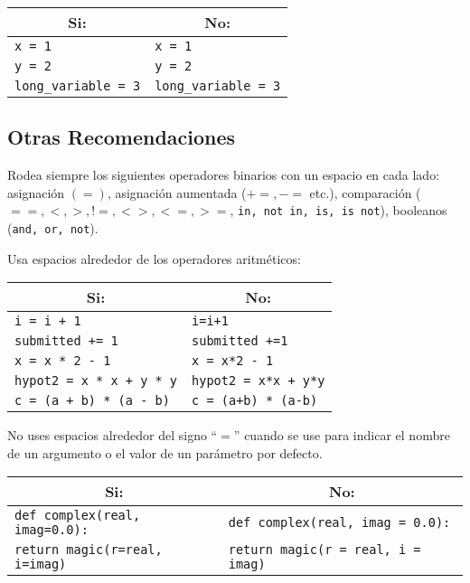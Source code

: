\begin{center}
\begin{tabular}{| l | l |}
\hline
\multicolumn{1}{|c|}{\textbf{Si:}} & \multicolumn{1}{c|}{\textbf{No:}} \\ \hline
\texttt{x = 1} & \texttt{x \hspace{2.7cm} = 1} \\
\texttt{y = 2} & \texttt{y \hspace{2.7cm} = 2} \\
\texttt{long\_variable = 3} &  \texttt{long\_variable = 3} \\ \hline
\end{tabular}
\end{center}
\subsection{Otras Recomendaciones}
Rodea siempre los siguientes operadores binarios con un espacio en cada lado: asignación $(=)$, asignación aumentada ($+=, -= $ etc.), comparación ($==, <, >, !=, <>, <=, >=$, \texttt{in, not in, is, is not}), booleanos (\texttt{and, or, not}).
\par
Usa espacios alrededor de los operadores aritméticos:
\begin{center}
\begin{tabular}{| l | l |}
\hline
\multicolumn{1}{|c|}{\textbf{Si:}} & \multicolumn{1}{c|}{\textbf{No:}} \\ \hline
\texttt{i = i + 1} & \texttt{i=i+1} \\
\texttt{submitted += 1} & \texttt{submitted +=1} \\
\texttt{x = x * 2 - 1} &  \texttt{x = x*2 - 1} \\
\texttt{hypot2 = x * x + y * y} &  \texttt{hypot2 = x*x + y*y} \\
\texttt{c = (a + b) * (a - b)} &  \texttt{c = (a+b) * (a-b)} \\ \hline
\end{tabular}
\end{center}
No uses espacios alrededor del signo \enquote{$=$} cuando se use para indicar el nombre de un argumento o el valor de un parámetro por defecto.
\begin{center}
\begin{tabular}{| l | l |}
\hline
\multicolumn{1}{|c|}{\textbf{Si:}} & \multicolumn{1}{c|}{\textbf{No:}} \\ \hline
\texttt{def complex(real, imag=0.0):} & \texttt{def complex(real, imag = 0.0):} \\
\texttt{\quad return magic(r=real, i=imag)} & \texttt{\quad return magic(r = real, i = imag)} \\ \hline
\end{tabular}
\end{center}
